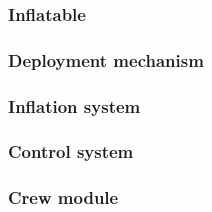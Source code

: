 %

\subsubsection{Inflatable}\label{subsec:infldes}


%

\subsubsection{Deployment mechanism}\label{subsec:depldes}


\subsubsection{Inflation system}\label{subsec:inflsys}


\subsubsection{Control system}\label{subsec:controlsys}


\subsubsection{Crew module}\label{subsec:crewmod}


